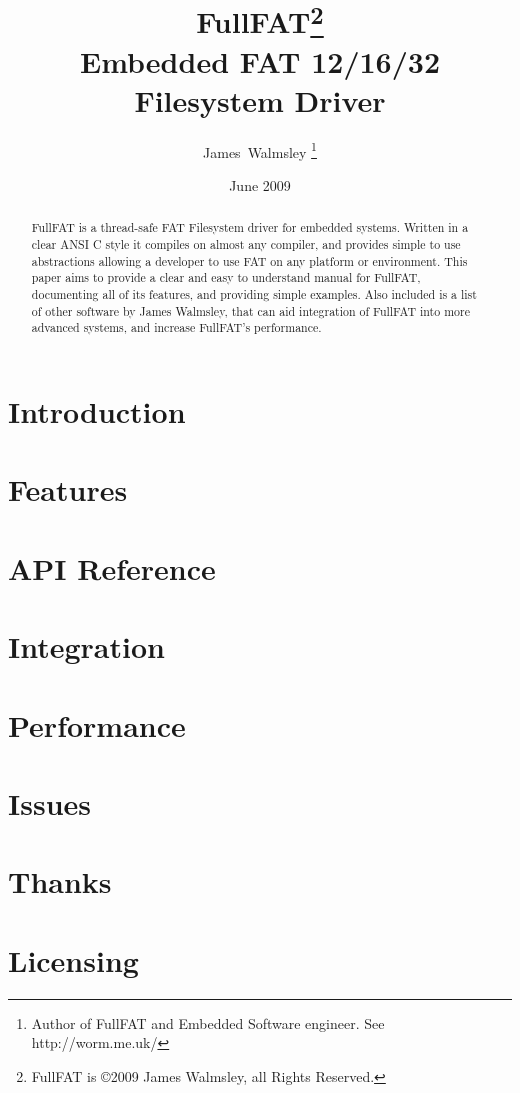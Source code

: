 \documentclass[final,a4paper,12pt]{article}
\begin{document}
\title{\Huge{FullFAT\footnote {FullFAT is \copyright  2009 James Walmsley, all Rights Reserved.}}\\\Large{Embedded FAT 12/16/32 Filesystem Driver}}
\author{James~Walmsley \thanks{Author of FullFAT and Embedded Software engineer. See http://worm.me.uk/}}
\date{June 2009}
\maketitle

\begin {abstract} 
FullFAT is a thread-safe FAT Filesystem driver for embedded systems. Written in a clear ANSI C style it compiles on almost any compiler, and provides simple to use abstractions allowing a developer to use FAT on any platform or environment. This paper aims to provide a clear and easy to understand manual for FullFAT, documenting all of its features, and providing simple examples. Also included is a list of other software by James Walmsley, that can aid integration of FullFAT into more advanced systems, and increase FullFAT's performance.

\end {abstract}

\newpage
\tableofcontents
\newpage
\section{Introduction}


\newpage
\section{Features}


\newpage
\section{API Reference}


\newpage
\section{Integration}


\newpage
\section{Performance}

\newpage
\section{Issues}

\newpage
\section{Thanks}


\newpage
\section{Licensing}

\end{document}
